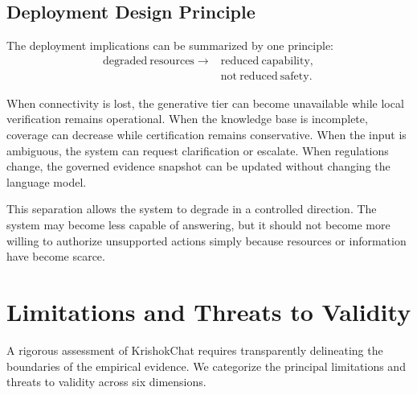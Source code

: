 \documentclass[a4paper,fleqn]{cas-dc}
\begin{document}
\subsection{Deployment Design Principle}

The deployment implications can be summarized by one principle:
\begin{equation}
\begin{aligned}
\mathrm{degraded\ resources} \longrightarrow {} & \mathrm{reduced\ capability}, \\
& \mathrm{not\ reduced\ safety}.
\end{aligned}
\end{equation}

When connectivity is lost, the generative tier can become unavailable while local verification remains operational. When the knowledge base is incomplete, coverage can decrease while certification remains conservative. When the input is ambiguous, the system can request clarification or escalate. When regulations change, the governed evidence snapshot can be updated without changing the language model.

This separation allows the system to degrade in a controlled direction. The system may become less capable of answering, but it should not become more willing to authorize unsupported actions simply because resources or information have become scarce.


\section{Limitations and Threats to Validity}
\label{sec:limitations}

A rigorous assessment of KrishokChat requires transparently delineating the boundaries of the empirical evidence. We categorize the principal limitations and threats to validity across six dimensions.
\end{document}
